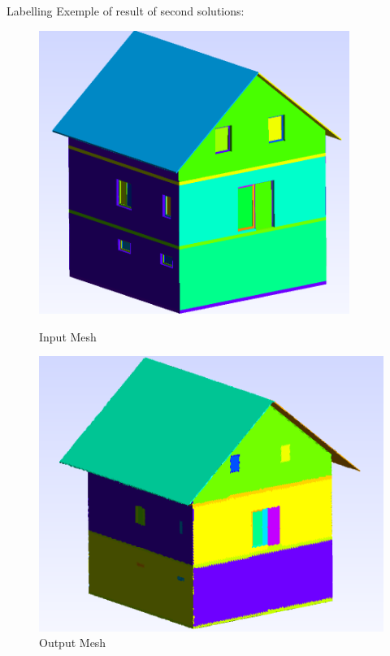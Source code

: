 \documentclass[10pt]{beamer}
\begin{document}
\begin{frame}{Labelling}
    Exemple of result of second solutions:
    \begin{figure}
        \centering
        \begin{minipage}{0.5\textwidth}
            \centering
            \includegraphics[width=0.9\textwidth]{../image/ACJasmin.png}
            \caption{Input Mesh}
            \label{fig:input_mesh}
        \end{minipage}%
        \begin{minipage}{0.5\textwidth}
            \centering
            \includegraphics[width=1.05\textwidth]{../image/ACjasmin_label.png}
            \caption{Output Mesh}
            \label{fig:output_mesh}
        \end{minipage}
    \end{figure}
\end{frame}
\end{document}
